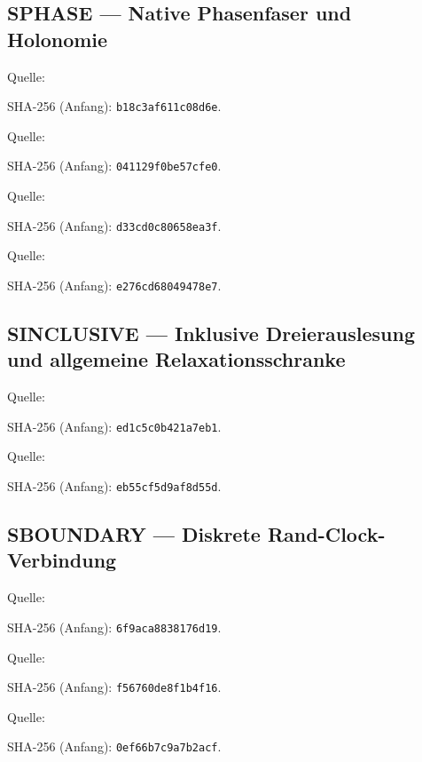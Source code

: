 \subsection*{SPHASE — Native Phasenfaser und Holonomie}\label{s:PHASE}
Quelle: \par{\footnotesize SHA-256 (Anfang): \texttt{b18c3af611c08d6e}.}\par
Quelle: \par{\footnotesize SHA-256 (Anfang): \texttt{041129f0be57cfe0}.}\par
Quelle: \par{\footnotesize SHA-256 (Anfang): \texttt{d33cd0c80658ea3f}.}\par
Quelle: \par{\footnotesize SHA-256 (Anfang): \texttt{e276cd68049478e7}.}\par
\subsection*{SINCLUSIVE — Inklusive Dreierauslesung und allgemeine Relaxationsschranke}\label{s:INCLUSIVE}
Quelle: \par{\footnotesize SHA-256 (Anfang): \texttt{ed1c5c0b421a7eb1}.}\par
Quelle: \par{\footnotesize SHA-256 (Anfang): \texttt{eb55cf5d9af8d55d}.}\par
\subsection*{SBOUNDARY — Diskrete Rand-Clock-Verbindung}\label{s:BOUNDARY}
Quelle: \par{\footnotesize SHA-256 (Anfang): \texttt{6f9aca8838176d19}.}\par
Quelle: \par{\footnotesize SHA-256 (Anfang): \texttt{f56760de8f1b4f16}.}\par
Quelle: \par{\footnotesize SHA-256 (Anfang): \texttt{0ef66b7c9a7b2acf}.}\par
